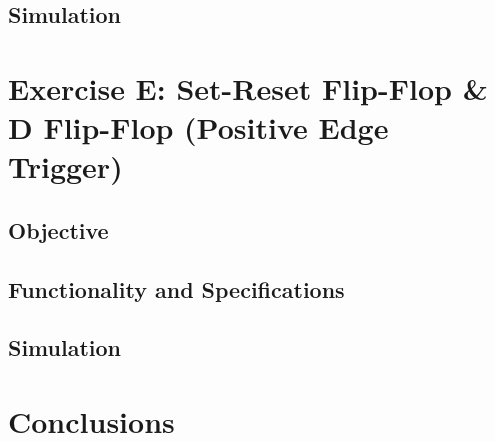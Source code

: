 \documentclass[12pt]{article}
\begin{document}
\subsection{Simulation}

\clearpage
\section{Exercise E: Set-Reset Flip-Flop \& D Flip-Flop (Positive Edge Trigger)}
\subsection{Objective}

\subsection{Functionality and Specifications}

\subsection{Simulation}

\section{Conclusions}
\end{document}
